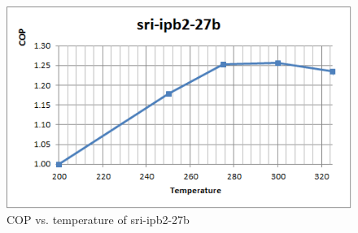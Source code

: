 \documentclass{article}
\begin{document}
\begin{figure}
\includegraphics[scale=1.0]{sri-ipb2-27b.png} 
\caption{COP vs. temperature of sri-ipb2-27b}%
\end{figure} 
\end{document}
